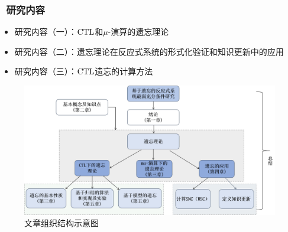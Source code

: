 \documentclass[9pt, CJK]{beamer}
\begin{document}
\begin{frame}
	\frametitle{~研究内容}
	{\footnotesize 	\begin{itemize}
		\item  研究内容（一）：$\textrm{CTL}$和$\mu$-演算的遗忘理论
		\item 研究内容（二）：遗忘理论在反应式系统的形式化验证和知识更新中的应用
		\item 研究内容（三）：$\textrm{CTL}$遗忘的计算方法
	\end{itemize}}
	\begin{figure}
		\includegraphics[scale=0.3]{figures/zuzhi}
		\caption{文章组织结构示意图}
	\end{figure}
\end{frame}


	
\end{document}

